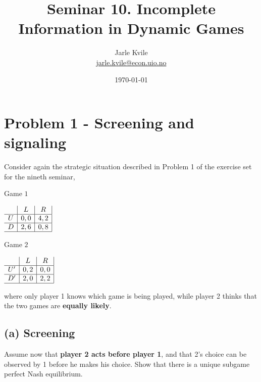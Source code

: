 \documentclass{article}
\title{Seminar 10. Incomplete Information in Dynamic Games}
\author{Jarle Kvile\\  \href{jarle.kvile@econ.uio.no}{jarle.kvile@econ.uio.no}}
\date{\today}
\begin{document}
\maketitle
 
\section{Problem 1 - Screening and signaling}

Consider again the strategic situation described in Problem 1 of the exercise set for the nineth seminar, 

\begin{center}
Game $1$ \vspace{6pt}

$
\begin{array}{c|c|c|}
 & L & R \\
\hline
U & 0,0 & 4,2 \\
\hline
D & 2,6 & 0,8 \\
\hline
\end{array}
$
\end{center}

\begin{center}
Game $2$ \vspace{6pt}

$
\begin{array}{c|c|c|}
 & L & R \\
\hline
U' & 0,2 & 0,0 \\
\hline
D' & 2,0 & 2,2 \\
\hline
\end{array}
$
\end{center}

where only player 1 knows which game is being played, while player 2 thinks that the two games are \textbf{equally likely}.


\subsection*{(a) Screening} Assume now that \textbf{player 2 acts before player 1}, and that 2's choice can be observed by 1 before he makes his choice. Show that there is a unique subgame perfect Nash equilibrium. 
\end{document}
